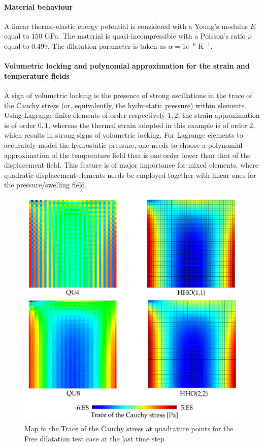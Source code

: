 \paragraph{Material behaviour}

A linear thermo-elastic energy potential is considered with a Young's
modulus $E$ equal to $150$ GPa. The material is quasi-incompressible
with a Poisson's ratio $\nu$ equal to $0.499$. The dilatation parameter
is taken as $\alpha = 1e^{-6}$ K$^{-1}$.

\paragraph{Volumetric locking and polynomial approximation for the strain and temperature fields}

A sign of volumetric locking is the presence of strong oscillations in the trace of the Cauchy stress (or, equivalently, the hydrostatic pressure) within elements.
Using Lagrange finite elements of order respectively $1, 2$, the
strain approximation is of order $0, 1$, whereas the thermal
strain adopted in this example is of order $2$, which results in strong signs of volumetric locking. For Lagrange
elements to accurately model the hydrostatic pressure, one needs to choose a polynomial approximation of the temperature field that is one order lower than that of the
displacement field. This feature is of major importance for mixed
elements, where quadratic displacement elements needs be employed together with linear ones for the pressure/swelling field.

\begin{figure}[H]
    \centering
    \includegraphics[width=10.cm]{../chapter_002_hho_mechanics/figures/satoh_calc.png}
    \caption{Map fo the Trace of the Cauchy stress at quadrature points for the Free dilatation test case at the last time step}
    \label{fig_satoh_calc}
\end{figure}

